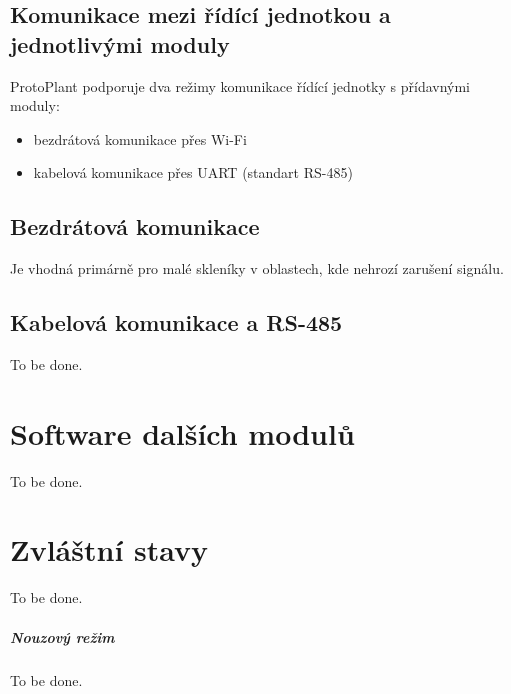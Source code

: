 \section{Komunikace mezi řídící jednotkou a jednotlivými moduly}
ProtoPlant podporuje dva režimy komunikace řídící jednotky s přídavnými moduly:
\begin{itemize}
    \item bezdrátová komunikace přes Wi-Fi
    \item kabelová komunikace přes UART (standart RS-485)
\end{itemize}

\section{Bezdrátová komunikace}
Je vhodná primárně pro malé skleníky v oblastech, kde nehrozí zarušení signálu.


\section{Kabelová komunikace a RS-485}
To be done.

\chapter{Software dalších modulů}
\label{chap:moduleSoftware}
To be done.

\chapter{Zvláštní stavy}
To be done.

\paragraph{Nouzový režim}
\label{paragraph:nouzovyRezim}
To be done.

\newpage